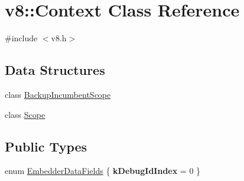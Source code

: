 \hypertarget{classv8_1_1Context}{}\section{v8\+:\+:Context Class Reference}
\label{classv8_1_1Context}


{\ttfamily \#include $<$v8.\+h$>$}

\subsection*{Data Structures}
\begin{DoxyCompactItemize}
\item 
class \mbox{\hyperlink{classv8_1_1Context_1_1BackupIncumbentScope}{Backup\+Incumbent\+Scope}}
\item 
class \mbox{\hyperlink{classv8_1_1Context_1_1Scope}{Scope}}
\end{DoxyCompactItemize}
\subsection*{Public Types}
\begin{DoxyCompactItemize}
\item 
enum \mbox{\hyperlink{classv8_1_1Context_a8e8a8c567e2d193f25f1ec211db0b5f9}{Embedder\+Data\+Fields}} \{ {\bfseries k\+Debug\+Id\+Index} = 0
 \}
\end{DoxyCompactItemize}
